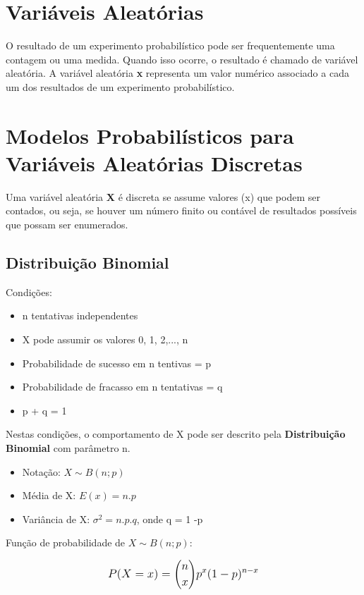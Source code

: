 \section{Variáveis Aleatórias}

O resultado de um experimento probabilístico pode ser frequentemente uma contagem ou uma medida. Quando isso ocorre, o resultado é chamado de variável aleatória. A variável aleatória \textbf{x} representa um valor numérico associado a cada um dos resultados de um experimento probabilístico.

\section{Modelos Probabilísticos para Variáveis Aleatórias Discretas}

Uma variável aleatória \textbf{X} é discreta se assume valores (x) que podem ser contados, ou seja, se houver um número finito ou contável de resultados possíveis que possam ser enumerados.

\subsection{Distribuição Binomial}

Condições:
\begin{itemize}
	\item n tentativas independentes
	\item X pode assumir os valores 0, 1, 2,..., n
	\item Probabilidade de sucesso em n tentivas = p
	\item Probabilidade de fracasso em n tentativas = q
	\item p + q = 1
\end{itemize}

Nestas condições, o comportamento de X pode ser descrito pela \textbf{Distribuição Binomial} com parâmetro n. 

\begin{itemize}
	\item Notação: \(X \sim B(n; p) \)
	\item Média de X: \( E(x) = n.p \)
	\item Variância de X: \( \sigma^2 = n.p.q \), onde q = 1 -p
\end{itemize}

Função de probabilidade de \(X \sim B(n; p) \):

\[\beq{ P(X = x) = \binom{n}{x} p^x (1 - p)^{n-x} }\]  

